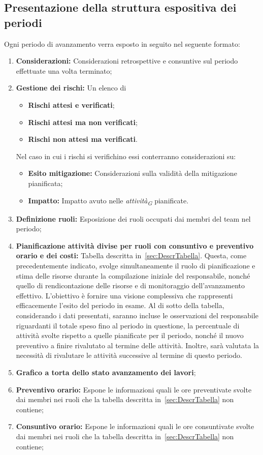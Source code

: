 \subsection{Presentazione della struttura espositiva dei periodi}
Ogni periodo di avanzamento verra esposto in seguito nel seguente formato:
\begin{enumerate}
    \item \textbf{Considerazioni:} Considerazioni retrospettive e consuntive sul periodo effettuate una volta terminato;
    \item \textbf{Gestione dei rischi:} Un elenco di 
            \begin{itemize}
                \item \textbf{Rischi attesi e verificati};
                \item \textbf{Rischi attesi ma non verificati};
                \item \textbf{Rischi non attesi ma verificati}.
            \end{itemize}
        Nel caso in cui i rischi si verifichino essi conterranno considerazioni su:
        \begin{itemize}
            \item \textbf{Esito mitigazione:} Considerazioni sulla validità della mitigazione pianificata;
            \item \textbf{Impatto:} Impatto avuto nelle \textit{attività}\textsubscript{\textit{G}} pianificate.
        \end{itemize}
    \item \textbf{Definizione ruoli:} Esposizione dei ruoli occupati dai membri del team nel periodo;
    \item \textbf{Pianificazione attività divise per ruoli con consuntivo e preventivo orario e dei costi:} Tabella descritta in~\ref{sec:DescrTabella}.
    Questa, come precedentemente indicato, svolge simultaneamente il ruolo di pianificazione e stima delle risorse durante la compilazione iniziale del responsabile, nonché quello di rendicontazione delle risorse e di monitoraggio dell'avanzamento effettivo. L'obiettivo è fornire una visione complessiva che rappresenti efficacemente l'esito del periodo in esame.
    \vspace*{0.2cm}
    Al di sotto della tabella, considerando i dati presentati, saranno incluse le osservazioni del responsabile riguardanti il totale speso fino al periodo in questione, la percentuale di attività svolte rispetto a quelle pianificate per il periodo, nonché il nuovo preventivo a finire rivalutato al termine delle attività. Inoltre, sarà valutata la necessità di rivalutare le attività successive al termine di questo periodo.
    \item \textbf{Grafico a torta dello stato avanzamento dei lavori};
    \item \textbf{Preventivo orario:} Espone le informazioni quali le ore preventivate svolte dai membri nei ruoli che la tabella descritta in~\ref{sec:DescrTabella} non contiene;
    \item \textbf{Consuntivo orario:} Espone le informazioni quali le ore consuntivate svolte dai membri nei ruoli che la tabella descritta in~\ref{sec:DescrTabella} non contiene;


\end{enumerate}
